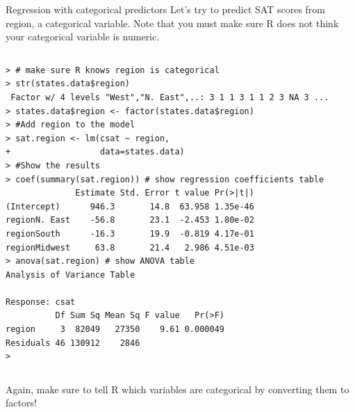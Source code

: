 \documentclass[table,smaller]{beamer}
\begin{document}
\begin{frame}[fragile,label=sec-3-2]{Regression with categorical predictors}
 Let's try to predict SAT scores from region, a categorical variable. Note that you must make sure R does not think your categorical variable is numeric. 
\vspace{-.5em}
\begin{columns}
\begin{block}{}
\begin{verbatim}
> # make sure R knows region is categorical
> str(states.data$region)
 Factor w/ 4 levels "West","N. East",..: 3 1 1 3 1 1 2 3 NA 3 ...
> states.data$region <- factor(states.data$region)
> #Add region to the model
> sat.region <- lm(csat ~ region,
+                  data=states.data) 
> #Show the results
> coef(summary(sat.region)) # show regression coefficients table
              Estimate Std. Error t value Pr(>|t|)
(Intercept)      946.3       14.8  63.958 1.35e-46
regionN. East    -56.8       23.1  -2.453 1.80e-02
regionSouth      -16.3       19.9  -0.819 4.17e-01
regionMidwest     63.8       21.4   2.986 4.51e-03
> anova(sat.region) # show ANOVA table
Analysis of Variance Table

Response: csat
          Df Sum Sq Mean Sq F value   Pr(>F)
region     3  82049   27350    9.61 0.000049
Residuals 46 130912    2846                 
>
\end{verbatim}
\end{block}
\end{columns}
\vspace{.5em}

Again, \alert{make sure to tell R which variables are categorical by converting them to factors!}
\end{frame}
\end{document}
